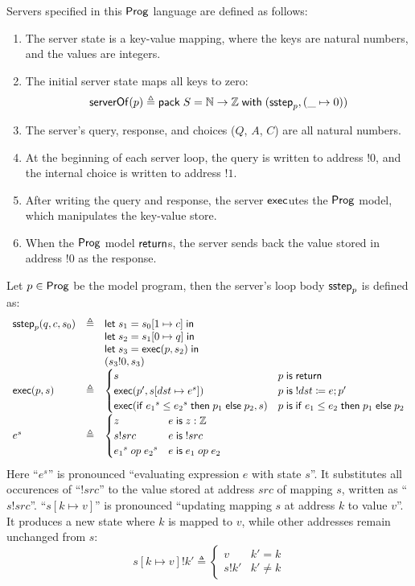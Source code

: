 Servers specified in this $\mathsf{Prog}$ language are defined as follows:
\begin{enumerate}
\item The server state is a key-value mapping, where the keys are natural
  numbers, and the values are integers.
\item The initial server state maps all keys to zero:
  \[\mathsf{serverOf}(p)\triangleq\mathsf{pack}\;S=\mathbb N\to\mathbb Z\;\mathsf{with}\;(\mathsf{sstep}_p,(\_\mapsto0))\]
\item The server's query, response, and choices ($Q$, $A$, $C$) are all
  natural numbers.
\item At the beginning of each server loop, the query is written to address
  $!0$, and the internal choice is written to address $!1$.
\item After writing the query and response, the server $\mathsf{exec}$utes the $\mathsf{Prog}$
  model, which manipulates the key-value store.
\item When the $\mathsf{Prog}$ model $\mathsf{return}$s, the server sends back the value stored
  in address $!0$ as the response.
\end{enumerate}
Let $p\in\mathsf{Prog}$ be the model program, then the server's loop body $\mathsf{sstep}_p$ is
defined as:
\[\begin{array}{lrl}
\mathsf{sstep}_p(q,c,s_0)&\triangleq&\mathsf{let}\;s_1=s_0[1\mapsto c]\;\mathsf{in}\;\\
&&\mathsf{let}\;s_2=s_1[0\mapsto q]\;\mathsf{in}\;\\
&&\mathsf{let}\;s_3=\mathsf{exec}(p,s_2)\;\mathsf{in}\;\\
&&(s_3!0,s_3)\\
\mathsf{exec}(p,s)&\triangleq&
\begin{cases}
  s&p\;\mathsf{is}\;\mathsf{return}\\
  \mathsf{exec}(p',s[dst\mapsto e^s])&p\;\mathsf{is}\; !dst\coloneqq e;p'\\
  \mathsf{exec}(\mathsf{if}\; {e_1}^s\le{e_2}^s\;\mathsf{then}\; p_1\;\mathsf{else}\; p_2,s)&p\;\mathsf{is}\;\mathsf{if}\; e_1\le e_2\;\mathsf{then}\; p_1\;\mathsf{else}\; p_2
\end{cases}\\
e^s&\triangleq&
\begin{cases}
  z&e\;\mathsf{is}\; z:\mathbb Z\\
  s!src&e\;\mathsf{is}\; !src\\
  {e_1}^s\;op\;{e_2}^s&e\;\mathsf{is}\; e_1\;op\;e_2
\end{cases}
\end{array}\]
Here ``$e^s$'' is pronounced ``evaluating expression $e$ with state $s$''.  It
substitutes all occurences of ``$!src$'' to the value stored at address $src$ of
mapping $s$, written as ``$s!src$''.  ``$s[k\mapsto v]$'' is pronounced
``updating mapping $s$ at address $k$ to value $v$''.  It produces a new state
where $k$ is mapped to $v$, while other addresses remain unchanged from $s$:
\[s[k\mapsto v]!k'\triangleq\begin{cases}v&k'=k\\
s!k'&k'\neq k\end{cases}\]

